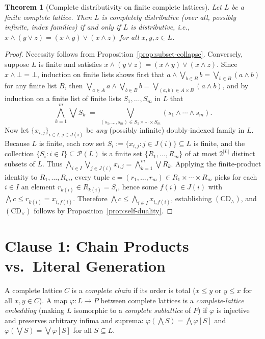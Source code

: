 \documentclass[11pt,a4paper]{article}
\theoremstyle{plain}
\newtheorem{theorem}{Theorem}[section]
\theoremstyle{definition}
\newcommand{\CDinf}{\mathrm{CD}_{\wedge}}
\newcommand{\CDsup}{\mathrm{CD}_{\vee}}
\begin{document}
\begin{theorem}[Complete distributivity on finite complete lattices]
\label{thm:finite-cd}
Let $L$ be a finite complete lattice. Then $L$ is completely distributive (over all,
possibly infinite, index families) if and only if $L$ is distributive, i.e.,
$x \wedge (y \vee z) = (x \wedge y) \vee (x \wedge z)$ for all $x, y, z \in L$.
\end{theorem}

\begin{proof}
Necessity follows from Proposition~\ref{prop:subset-collapse}. Conversely, suppose $L$
is finite and satisfies $x \wedge (y \vee z) = (x \wedge y) \vee (x \wedge z)$. Since
$x \wedge \bot = \bot$, induction on finite lists shows first that
$a \wedge \bigvee_{b \in B} b = \bigvee_{b \in B} (a \wedge b)$ for any finite list $B$,
then $\bigvee_{a \in A} a \wedge \bigvee_{b \in B} b = \bigvee_{(a,b) \in A \times B} (a \wedge b)$,
and by induction on a finite list of finite lists $S_1, \dots, S_m$ in $L$ that
\[
  \bigwedge_{k=1}^m \bigvee S_k
  \;=\;
  \bigvee_{(s_1, \dots, s_m) \in S_1 \times \cdots \times S_m} (s_1 \wedge \cdots \wedge s_m).
\]
Now let $\{x_{i,j}\}_{i \in I,\, j \in J(i)}$ be \emph{any} (possibly infinite) doubly-indexed
family in $L$. Because $L$ is finite, each row set $S_i := \{x_{i,j} : j \in J(i)\} \subseteq L$
is finite, and the collection $\{S_i : i \in I\} \subseteq \mathcal{P}(L)$ is a finite set
$\{R_1, \dots, R_m\}$ of at most $2^{|L|}$ distinct subsets of $L$. Thus
$\bigwedge_{i \in I} \bigvee_{j \in J(i)} x_{i,j} = \bigwedge_{k=1}^m \bigvee R_k$.
Applying the finite-product identity to $R_1, \dots, R_m$, every tuple
$c = (r_1, \dots, r_m) \in R_1 \times \cdots \times R_m$ picks for each $i \in I$ an element
$r_{k(i)} \in R_{k(i)} = S_i$, hence some $f(i) \in J(i)$ with $\bigwedge c \le r_{k(i)} = x_{i, f(i)}$.
Therefore $\bigwedge c \le \bigwedge_{i \in I} x_{i, f(i)}$, establishing $(\CDinf)$, and
$(\CDsup)$ follows by Proposition~\ref{prop:self-duality}.
\end{proof}

\section{Clause 1: Chain Products vs.\ Literal Generation}

A complete lattice $C$ is a \emph{complete chain} if its order is total ($x \le y$ or
$y \le x$ for all $x, y \in C$). A map $\varphi : L \to P$ between complete lattices is a
\emph{complete-lattice embedding} (making $L$ isomorphic to a \emph{complete sublattice}
of $P$) if $\varphi$ is injective and preserves arbitrary infima and suprema:
$\varphi(\bigwedge S) = \bigwedge \varphi[S]$ and $\varphi(\bigvee S) = \bigvee \varphi[S]$
for all $S \subseteq L$.
\end{document}
